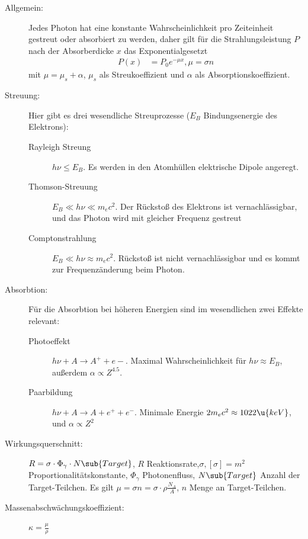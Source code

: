 \documentclass[twocolumn]{summery_4.1}
\begin{document}
\begin{description}
    \item[Allgemein:] Jedes Photon hat eine konstante Wahrscheinlichkeit pro Zeiteinheit gestreut oder absorbiert zu werden, daher gilt für die Strahlungsleistung \(P\) nach der Absorberdicke \(x\) das Exponentialgesetzt
    \begin{align*}
        P(x) &= P_0 e^{-\mu x}, \mu = \sigma n
    \end{align*}  
    mit $\mu = \mu_s+\alpha$, \(\mu_s\) als Streukoeffizient und \(\alpha\) als Absorptionskoeffizient.
    \item[Streuung:] Hier gibt es drei wesendliche Streuprozesse ($E_B$ Bindungsenergie des Elektrons):
    \begin{description}
        \item[Rayleigh Streung] \(h\nu  \le E_B\). Es werden in den Atomhüllen elektrische Dipole angeregt.   
        \item[Thomson-Streuung] \(E_B\ll h\nu\ll m_ec^2\). Der Rückstoß des Elektrons ist vernachlässigbar, und das Photon wird mit gleicher Frequenz gestreut 
        \item[Comptonstrahlung] \(E_B\ll h\nu \approx m_ec^2\). Rückstoß ist nicht vernachlässigbar und es kommt zur Frequenzänderung beim Photon.  
    \end{description}
    \item[Absorbtion:] Für die Absorbtion bei höheren Energien sind im wesendlichen zwei Effekte relevant:
    \begin{description}
        \item[Photoeffekt] \(h\nu + A\to A^+ + e-\). Maximal Wahrscheinlichkeit für \(h\nu \approx E_B\), außerdem \(\alpha\propto Z^{4.5}\).
        \item[Paarbildung] \(h\nu + A \to A + e^+ + e^-\). Minimale Energie \(2 m_e c^2 \approx 1022\u{keV}\), und \(\alpha\propto Z^2\) 
    \end{description}
    \item[Wirkungsquerschnitt:] \(R = \sigma\cdot \Phi_\gamma \cdot N\sub{Target}\), \(R\) Reaktionsrate,\(\sigma, [\sigma]=m^2\) Proportionalitätskonstante, \(\Phi_\gamma\) Photonenfluss, \(N\sub{Target}\) Anzahl der Target-Teilchen. Es gilt \(\mu = \sigma n =\sigma \cdot \rho \frac{N_A}A\), \(n\) Menge an Target-Teilchen. 
    \item[Massenabschwächungskoeffizient:] \(\kappa =\frac{\mu}\rho\)
\end{description}
\end{document}
